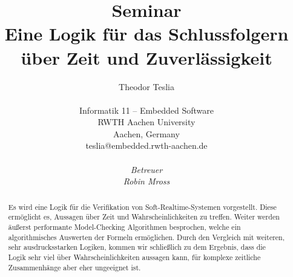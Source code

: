 \documentclass{lni}
\author{
	Theodor Teslia \\ 
	\\ 
	Informatik 11 -- Embedded Software \\ 
	RWTH Aachen University \\ 
	Aachen, Germany \\ 
	teslia@embedded.rwth-aachen.de\\
	\\
	\textit{Betreuer}\\
	\textit{Robin Mross}\\ %
}
\title{\small{Seminar} \\ \vspace{0.5cm} \Large{Eine Logik für das Schlussfolgern über Zeit und Zuverlässigkeit}}
\theoremstyle{def_style}
\theoremstyle{break}
\begin{document}
\maketitle

\begin{abstract}
	Es wird eine Logik für die Verifikation von Soft-Realtime-Systemen vorgestellt.
	Diese ermöglicht es, Aussagen über Zeit und Wahrscheinlichkeiten zu treffen.
	Weiter werden äußerst performante Model-Checking Algorithmen besprochen, welche ein algorithmisches Auswerten der Formeln ermöglichen.
	Durch den Vergleich mit weiteren, sehr ausdrucksstarken Logiken, kommen wir schließlich zu dem Ergebnis, dass die Logik sehr viel über Wahrscheinlichkeiten aussagen kann, für komplexe zeitliche Zusammenhänge aber eher ungeeignet ist.
\end{abstract}














\end{document}
